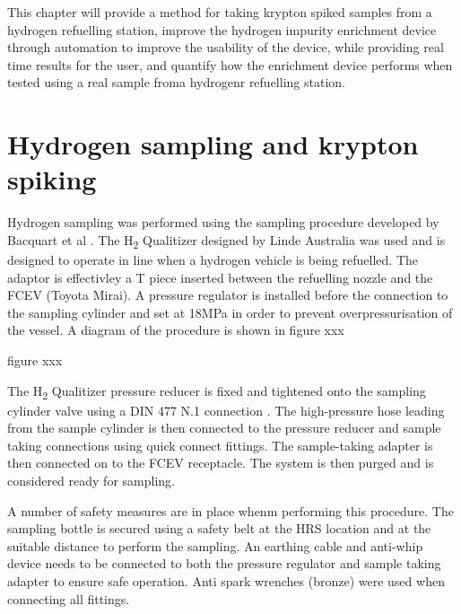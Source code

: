 This chapter will provide a method for taking krypton spiked samples from a hydrogen refuelling station, improve the hydrogen impurity enrichment device through automation to improve the usability of the device, while providing real time results for the user, and quantify how the enrichment device performs when tested using a real sample froma  hydrogenr refuelling station. 

\section{Hydrogen sampling and krypton spiking}\label{sampletake}
Hydrogen sampling was performed using the sampling procedure developed by Bacquart et al \cite{BACQUART20205565}. The H\textsubscript{2} Qualitizer designed by Linde Australia was used and is designed to operate in line when a hydrogen vehicle is being refuelled. The adaptor is effectivley a T piece inserted between the refuelling nozzle and the FCEV (Toyota Mirai). A pressure regulator is installed before the connection to the sampling cylinder and set at 18MPa in order to prevent overpressurisation of the vessel. A diagram of the procedure is shown in figure xxx

figure xxx

The H\textsubscript{2} Qualitizer pressure reducer is fixed and tightened onto the sampling cylinder valve using a DIN 477 N.1 connection . The high-pressure hose leading from the sample cylinder is then connected to the pressure reducer and sample taking connections using quick connect fittings.  The sample-taking adapter is then connected on to the FCEV receptacle. The system is then purged and is considered ready for sampling. 
 
A number of safety measures are in place whenm performing this procedure. The sampling bottle is secured using a safety belt at the HRS location and at the suitable distance to perform the sampling. An earthing cable and anti-whip device needs to be connected to both the pressure regulator and sample taking adapter to ensure safe operation. Anti spark wrenches (bronze) were used when connecting all fittings.

